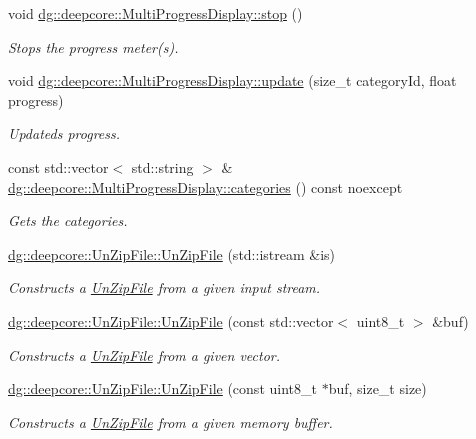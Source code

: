 \begin{DoxyCompactItemize}
void \hyperlink{group___utility_module_ga2f43542bd34ad2f51b7c368d4e94e650}{dg\+::deepcore\+::\+Multi\+Progress\+Display\+::stop} ()
\begin{DoxyCompactList}\small\item\em Stops the progress meter(s). \end{DoxyCompactList}\item 
void \hyperlink{group___utility_module_gadbcb8e02b7d21ce799baa34e93bc9fee}{dg\+::deepcore\+::\+Multi\+Progress\+Display\+::update} (size\+\_\+t category\+Id, float progress)
\begin{DoxyCompactList}\small\item\em Updateds progress. \end{DoxyCompactList}\item 
const std\+::vector$<$ std\+::string $>$ \& \hyperlink{group___utility_module_ga89b9c96322231a81b2e64f178a8291e3}{dg\+::deepcore\+::\+Multi\+Progress\+Display\+::categories} () const noexcept
\begin{DoxyCompactList}\small\item\em Gets the categories. \end{DoxyCompactList}\item 
\hyperlink{group___utility_module_gac32fa3973017fa76647d90ab64bbceae}{dg\+::deepcore\+::\+Un\+Zip\+File\+::\+Un\+Zip\+File} (std\+::istream \&is)
\begin{DoxyCompactList}\small\item\em Constructs a \hyperlink{classdg_1_1deepcore_1_1_un_zip_file}{Un\+Zip\+File} from a given input stream. \end{DoxyCompactList}\item 
\hyperlink{group___utility_module_ga64e2c80586cc8429067c15ab1fa39e08}{dg\+::deepcore\+::\+Un\+Zip\+File\+::\+Un\+Zip\+File} (const std\+::vector$<$ uint8\+\_\+t $>$ \&buf)
\begin{DoxyCompactList}\small\item\em Constructs a \hyperlink{classdg_1_1deepcore_1_1_un_zip_file}{Un\+Zip\+File} from a given vector. \end{DoxyCompactList}\item 
\hyperlink{group___utility_module_ga1efd284e3fbbef3d57a598c47a7cc73b}{dg\+::deepcore\+::\+Un\+Zip\+File\+::\+Un\+Zip\+File} (const uint8\+\_\+t $\ast$buf, size\+\_\+t size)
\begin{DoxyCompactList}\small\item\em Constructs a \hyperlink{classdg_1_1deepcore_1_1_un_zip_file}{Un\+Zip\+File} from a given memory buffer. \end{DoxyCompactList}\item 

\end{DoxyCompactItemize}
